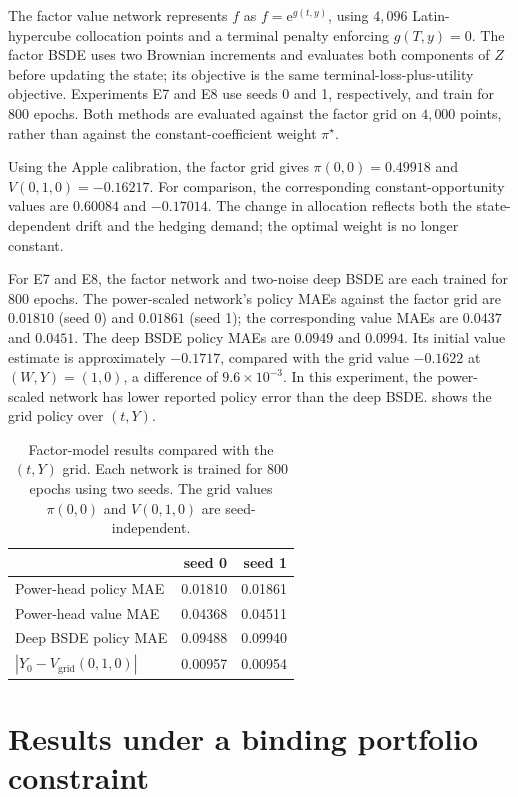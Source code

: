 \documentclass[11pt,a4paper]{article}
\begin{document}
The factor value network represents $f$ as $f=\mathrm e^{g(t,y)}$, using $4{,}096$ Latin-hypercube collocation points and a terminal penalty enforcing $g(T,y)=0$. The factor BSDE uses two Brownian increments and evaluates both components of $Z$ before updating the state; its objective is the same terminal-loss-plus-utility objective. Experiments E7 and E8 use seeds 0 and 1, respectively, and train for 800 epochs. Both methods are evaluated against the factor grid on $4{,}000$ points, rather than against the constant-coefficient weight $\pi^{\star}$.

Using the Apple calibration, the factor grid gives $\pi(0,0)=0.49918$ and $V(0,1,0)=-0.16217$. For comparison, the corresponding constant-opportunity values are $0.60084$ and $-0.17014$. The change in allocation reflects both the state-dependent drift and the hedging demand; the optimal weight is no longer constant.

For E7 and E8, the factor network and two-noise deep BSDE are each trained for 800 epochs. The power-scaled network's policy MAEs against the factor grid are $0.01810$ (seed 0) and $0.01861$ (seed 1); the corresponding value MAEs are $0.0437$ and $0.0451$. The deep BSDE policy MAEs are $0.0949$ and $0.0994$. Its initial value estimate is approximately $-0.1717$, compared with the grid value $-0.1622$ at $(W,Y)=(1,0)$, a difference of $9.6\times 10^{-3}$. In this experiment, the power-scaled network has lower reported policy error than the deep BSDE.  shows the grid policy over $(t,Y)$.

\begin{table}[H]
\centering
\caption{Factor-model results compared with the $(t,Y)$ grid. Each network is trained for 800 epochs using two seeds. The grid values $\pi(0,0)$ and $V(0,1,0)$ are seed-independent.}
\label{tab:factor}
\begin{tabular}{lrr}
\toprule
 & seed 0 & seed 1 \\
\midrule
Power-head policy MAE & 0.01810 & 0.01861 \\
Power-head value MAE & 0.04368 & 0.04511 \\
Deep BSDE policy MAE & 0.09488 & 0.09940 \\
$|Y_0-V_{\mathrm{grid}}(0,1,0)|$ & 0.00957 & 0.00954 \\
\bottomrule
\end{tabular}
\end{table}

\section{Results under a binding portfolio constraint}
\label{sec:cap}
\end{document}
